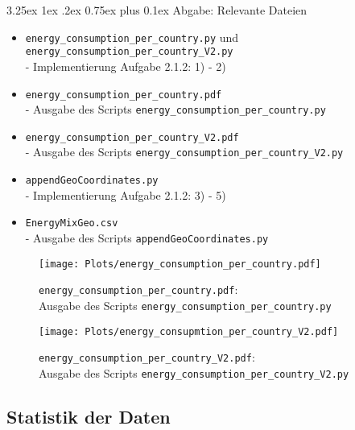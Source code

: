 \documentclass[12pt,a4paper]{scrartcl}
\makeatletter
\renewcommand\subparagraph{\@startsection{subparagraph}{5}{\parindent}%
    {3.25ex \@plus1ex \@minus .2ex}%
    {0.75ex plus 0.1ex}%
    {\normalfont\normalsize\bfseries}}
\makeatother
\begin{document}
\subparagraph{Abgabe: Relevante Dateien}
\begin{itemize}
\item \lstinline{energy_consumption_per_country.py} und \lstinline{energy_consumption_per_country_V2.py} \\- Implementierung Aufgabe 2.1.2: 1) - 2)
\item \lstinline{energy_consumption_per_country.pdf} \\- Ausgabe des Scripts \lstinline{energy_consumption_per_country.py} 
\item \lstinline{energy_consumption_per_country_V2.pdf} \\- Ausgabe des Scripts \lstinline{energy_consumption_per_country_V2.py}
\item \lstinline{appendGeoCoordinates.py} \\- Implementierung Aufgabe 2.1.2: 3) - 5)
\item \lstinline|EnergyMixGeo.csv|  \\- Ausgabe des Scripts \lstinline{appendGeoCoordinates.py}
\end{itemize}

\newpage
\begin{figure}[!h]
\texttt{[image: Plots/energy\_consumption\_per\_country.pdf]}
\caption{\lstinline{energy_consumption_per_country.pdf}: \\Ausgabe des Scripts \lstinline{energy_consumption_per_country.py}}
\end{figure}
\begin{figure}[!h]
\texttt{[image: Plots/energy\_consupmtion\_per\_country\_V2.pdf]}
\caption{\lstinline{energy_consumption_per_country_V2.pdf}: \\Ausgabe des Scripts \lstinline{energy_consumption_per_country_V2.py}}
\end{figure}





\subsection*{Statistik der Daten}
\end{document}
